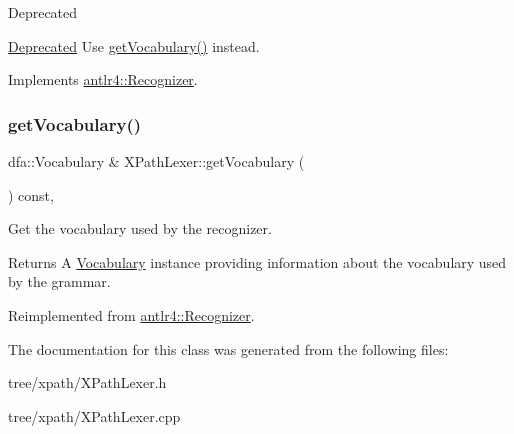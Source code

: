 \begin{DoxyRefDesc}{Deprecated}
\item[\hyperlink{deprecated__deprecated000010}{Deprecated}]Use \hyperlink{classXPathLexer_acf45ddece8356cd0fcaa1189687c1f64}{get\+Vocabulary()} instead. \end{DoxyRefDesc}


Implements \hyperlink{classantlr4_1_1Recognizer_aef9436cfc73e828229b90a57c8ff2493}{antlr4\+::\+Recognizer}.

\mbox{\label{classXPathLexer_acf45ddece8356cd0fcaa1189687c1f64}} 
\subsubsection{\texorpdfstring{get\+Vocabulary()}{getVocabulary()}}
{\footnotesize\ttfamily dfa\+::\+Vocabulary \& X\+Path\+Lexer\+::get\+Vocabulary (\begin{DoxyParamCaption}{ }\end{DoxyParamCaption}) const\hspace{0.3cm}{\ttfamily [override]}, {\ttfamily [virtual]}}

Get the vocabulary used by the recognizer.

\begin{DoxyReturn}{Returns}
A \hyperlink{}{Vocabulary} instance providing information about the vocabulary used by the grammar. 
\end{DoxyReturn}


Reimplemented from \hyperlink{classantlr4_1_1Recognizer_aae7ec953d3f35749e62ccb96fa3e0946}{antlr4\+::\+Recognizer}.



The documentation for this class was generated from the following files\+:\begin{DoxyCompactItemize}
\item 
tree/xpath/X\+Path\+Lexer.\+h\item 
tree/xpath/X\+Path\+Lexer.\+cpp\end{DoxyCompactItemize}
